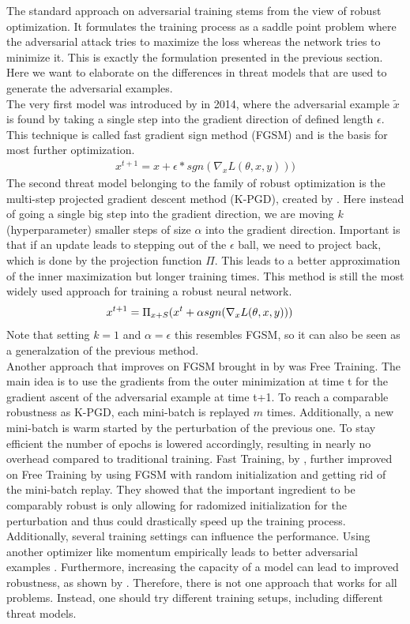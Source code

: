 \documentclass[conference]{IEEEtran}
\begin{document}
The standard approach on adversarial training stems from the view of robust optimization. It formulates the training process as a saddle point problem where the adversarial attack tries to maximize the loss whereas the network tries to minimize it. This is exactly the formulation presented in the previous section. Here we want to elaborate on the differences in threat models that are used to generate the adversarial examples. \\
The very first model was introduced by \cite{b9} in 2014, where the adversarial example $\tilde{x}$ is found by taking a single step into the gradient direction of defined length $\epsilon$. This technique is called fast gradient sign method (FGSM) and is the basis for most further optimization.
\begin{align*}
x^{t+1} = x + \epsilon * sgn(\nabla_x L(\theta,x,y)))
\end{align*}
The second threat model belonging to the family of robust optimization is the multi-step projected gradient descent method (K-PGD), created by \cite{b28}. Here instead of going a single big step into the gradient direction, we are moving $k$ (hyperparameter) smaller steps of size $\alpha$ into the gradient direction. Important is that if an update leads to stepping out of the $\epsilon$ ball, we need to project back, which is done by the projection function $\Pi$. This leads to a better approximation of the inner maximization but longer training times. This method is still the most widely used approach for training a robust neural network. 
\begin{align*}
  x^{t+1} &= \Pi_{x+S} (x^t + \alpha \space sgn(\nabla_x L(\theta,x,y)))
\end{align*}
Note that setting $k=1$ and $\alpha=\epsilon$ this resembles FGSM, so it can also be seen as a generalzation of the previous method. \\
Another approach that improves on FGSM brought in by \cite{b5} was Free Training. The main idea is to use the gradients from the outer minimization at time t for the gradient ascent of the adversarial example at time t+1. To reach a comparable robustness as K-PGD, each mini-batch is replayed $m$ times. Additionally, a new mini-batch is warm started by the perturbation of the previous one. To stay efficient the number of epochs is lowered accordingly, resulting in nearly no overhead compared to traditional training.
Fast Training, by \cite{b3}, further improved on Free Training by using FGSM with random initialization and getting rid of the mini-batch replay. They showed that the important ingredient to be comparably robust is only allowing for radomized initialization for the perturbation and thus could drastically speed up the training process. \\
Additionally, several training settings can influence the performance. Using another optimizer like momentum empirically leads to better adversarial examples \cite{b29}. Furthermore, increasing the capacity of a model can lead to improved robustness, as shown by \cite{b2}. Therefore, there is not one approach that works for all problems. Instead, one should try different training setups, including different threat models.
\end{document}

